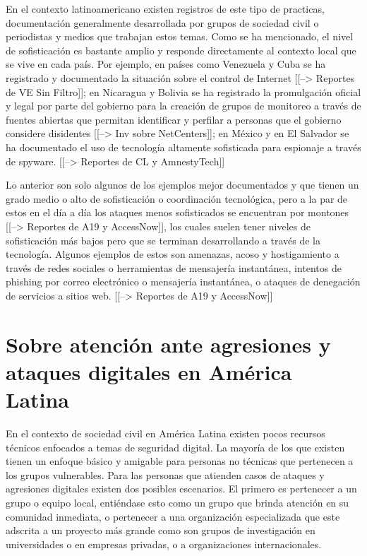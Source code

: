 \documentclass[12pt]{caltech_thesis}
\begin{document}
En el contexto latinoamericano existen registros de este tipo de practicas, documentación generalmente desarrollada por grupos de sociedad civil o periodistas y medios que trabajan estos temas. Como se ha mencionado, el nivel de sofisticación es bastante amplio y responde directamente al contexto local que se vive en cada país. Por ejemplo, en países como Venezuela y Cuba se ha registrado y documentado la situación sobre el control de Internet [[--> Reportes de VE Sin Filtro]]; en Nicaragua y Bolivia se ha registrado la promulgación oficial y legal por parte del gobierno para la creación de grupos de monitoreo a través de fuentes abiertas que permitan identificar y perfilar a personas que el gobierno considere disidentes [[--> Inv sobre NetCenters]]; en México y en El Salvador se ha documentado el uso de tecnología altamente sofisticada para espionaje a través de spyware. [[--> Reportes de CL y AmnestyTech]]

Lo anterior son solo algunos de los ejemplos mejor documentados y que tienen un grado medio o alto de sofisticación o coordinación tecnológica, pero a la par de estos en el día a día los ataques menos sofisticados se encuentran por montones [[--> Reportes de A19 y AccessNow]], los cuales suelen tener niveles de sofisticación más bajos pero que se terminan desarrollando a través de la tecnología. Algunos ejemplos de estos son amenazas, acoso y hostigamiento a través de redes sociales o herramientas de mensajería instantánea, intentos de phishing por correo electrónico o mensajería instantánea, o ataques de denegación de servicios a sitios web. [[--> Reportes de A19 y AccessNow]]

\section{Sobre atención ante agresiones y ataques digitales en América Latina}

En el contexto de sociedad civil en América Latina  existen pocos recursos técnicos enfocados a temas de seguridad digital. La mayoría de los que existen tienen un enfoque básico y amigable para personas no técnicas que pertenecen a los grupos vulnerables. Para las personas que atienden casos de ataques y agresiones digitales existen dos posibles escenarios. El primero es pertenecer a un grupo o equipo local, entiéndase esto como un grupo que brinda atención en su comunidad inmediata, o pertenecer a una organización especializada que este adscrita a un proyecto más grande como son grupos de investigación en universidades o en empresas privadas, o a organizaciones internacionales.
\end{document}
